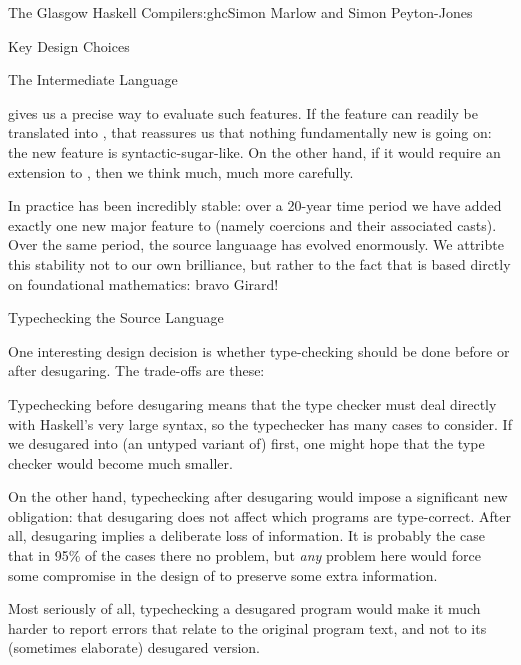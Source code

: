 \begin{aosachapter}{The Glasgow Haskell Compiler}{s:ghc}{Simon Marlow and Simon Peyton-Jones}
\begin{aosasect1}{Key Design Choices}
\begin{aosasect2}{The Intermediate Language}
\begin{aosaitemize}
  \Core{} gives us a precise way to evaluate such features.  If the
  feature can readily be translated into \Core{}, that reassures us
  that nothing fundamentally new is going on: the new feature is
  syntactic-sugar-like. On the other hand, if it would require an
  extension to \Core, then we think much, much more carefully.

\end{aosaitemize}

In practice \Core{} has been incredibly stable: over a 20-year time
period we have added exactly one new major feature to \Core{} (namely
coercions and their associated casts).  Over the same period, the
source languaage has evolved enormously.  We attribte this stability
not to our own brilliance, but rather to the fact that \Core{} is
based dirctly on foundational mathematics: bravo Girard!

\end{aosasect2}

\begin{aosasect2}{Typechecking the Source Language}

One interesting design decision is whether type-checking should be
done before or after desugaring.  The trade-offs are these:

\begin{aosaitemize}

\item Typechecking before desugaring means that the type checker must
  deal directly with Haskell's very large syntax, so the typechecker
  has many cases to consider.  If we desugared into (an untyped
  variant of) \Core{} first, one might hope that the type checker
  would become much smaller.

\item On the other hand, typechecking after desugaring would impose a
  significant new obligation: that desugaring does not affect which
  programs are type-correct.  After all, desugaring implies a
  deliberate loss of information.  It is probably the case that in
  95\% of the cases there no problem, but \emph{any} problem here
  would force some compromise in the design of \Core{} to preserve
  some extra information.

\item Most seriously of all, typechecking a desugared program would
  make it much harder to report errors that relate to the original
  program text, and not to its (sometimes elaborate) desugared
  version.

\end{aosaitemize}


\end{aosasect2}
\end{aosasect1}
\end{aosachapter}
